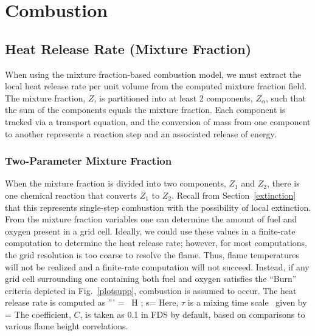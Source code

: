 \documentclass[11pt]{book}
\begin{document}
\clearpage
\section{Combustion}

\subsection{Heat Release Rate (Mixture Fraction)}


When using the mixture fraction-based combustion model, we must extract the local heat release rate per unit
volume from the computed mixture
fraction field. The mixture fraction, $Z$, is partitioned into at least 2 components, $Z_\alpha$, such that the
sum of the components equals the mixture
fraction. Each component is tracked via a transport equation, and the conversion of mass from one
component to another represents a reaction step and an associated release of energy.


\subsubsection{Two-Parameter Mixture Fraction}

When the mixture fraction is divided into two components, $Z_1$ and $Z_2$, there is one chemical
reaction that converts $Z_1$ to $Z_2$.  Recall from Section~\ref{extinction}
that this represents single-step combustion with the possibility of local extinction.  From the mixture fraction
variables one can determine the amount of fuel and oxygen present in a grid cell.  Ideally, we could use these values
in a finite-rate computation to determine the heat release rate; however, for most computations, the
grid resolution is too coarse to resolve the flame.  Thus, flame temperatures will not be realized and a
finite-rate computation will not succeed.
Instead, if any grid cell surrounding one containing both fuel and oxygen satisfies the ``Burn'' criteria depicted in Fig.~\ref{plotsupp},
combustion is assumed to occur.  The heat release rate is computed as
\be \dq''' =  \, \Delta H  \quad ; \quad s=   \ee
Here, $\tau$ is a mixing time scale~\cite{Raman:CF} given by
\be \tau =   \ee
The coefficient, $C$, is taken as 0.1 in FDS by default, based on comparisons to various flame height correlations.
\end{document}
